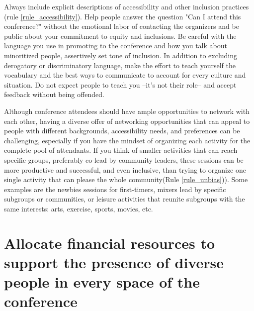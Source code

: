 \documentclass[10pt,letterpaper]{article}
\begin{document}
Always include explicit descriptions of accessibility and other inclusion practices (rule \ref{rule_accessibility}). Help people answer the question "Can I attend this conference?" without the emotional labor of contacting the organizers and be public about your commitment to equity and inclusions. Be careful with the language you use in promoting to the conference and how you talk about minoritized people, assertively set tone of inclusion. In addition to excluding derogatory or discriminatory language, make the effort to teach yourself the vocabulary and the best ways to communicate to account for every culture and situation. Do not expect people to teach you --it's not their role-- and accept feedback without being offended.


Although conference attendees should have ample opportunities to network with each other, having a diverse offer of networking opportunities that can appeal to people with different backgrounds, accessibility needs, and preferences can be challenging, especially if you have the mindset of organizing each activity for the complete pool of attendants. If you think of smaller activities that can reach specific groups, preferably co-lead by community leaders, these sessions can be more productive and successful, and even inclusive, than trying to organize one single activity that can please the whole community(Rule \ref{rule_unbias})). Some examples are the newbies sessions for first-timers, mixers lead by specific subgroups or communities, or leisure activities that reunite subgroups with the same interests: arts, exercise, sports, movies, etc.







\section{Allocate financial resources to support the presence of diverse people in every space of the conference
}
\label{rule_financial}
\end{document}
